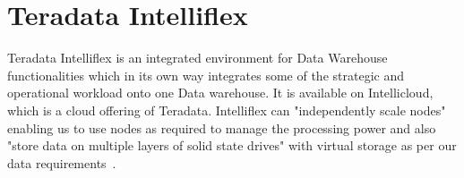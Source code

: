 \section{Teradata Intelliflex}

Teradata Intelliflex is an integrated environment for Data Warehouse 
functionalities which in its own way integrates some of the strategic and 
operational workload onto one Data warehouse. It is available on Intellicloud, 
which is a cloud offering of Teradata. Intelliflex can "independently 
scale nodes" enabling us to use nodes as required to manage the processing 
power and also "store data on multiple layers of solid state drives" with 
virtual storage as per our data
requirements~\cite{hid-sp18-418-Teradata-Intelliflex-features}. 
